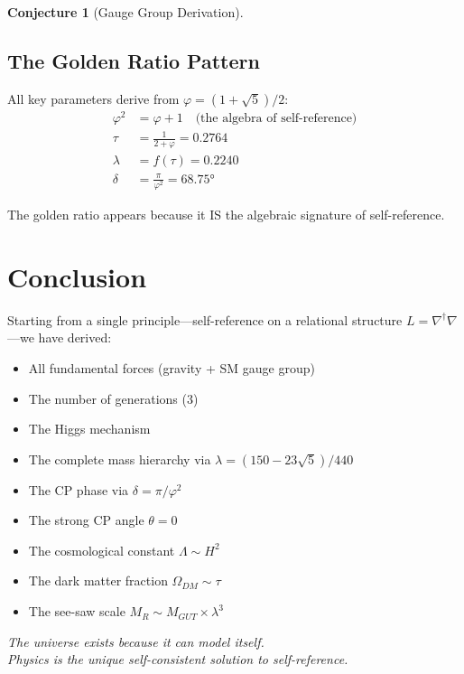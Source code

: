 \documentclass[11pt,a4paper]{article}
\theoremstyle{plain}
\theoremstyle{definition}
\newtheorem{conjecture}[theorem]{Conjecture}
\theoremstyle{remark}
\begin{document}
\begin{conjecture}[Gauge Group Derivation]
\subsection{The Golden Ratio Pattern}

All key parameters derive from $\varphi = (1+\sqrt{5})/2$:
\begin{align}
\varphi^2 &= \varphi + 1 \quad \text{(the algebra of self-reference)} \\
\tau &= \frac{1}{2+\varphi} = 0.2764 \\
\lambda &= f(\tau) = 0.2240 \\
\delta &= \frac{\pi}{\varphi^2} = 68.75°
\end{align}

The golden ratio appears because it IS the algebraic signature of self-reference.

\section{Conclusion}

Starting from a single principle---self-reference on a relational structure $L = \nabla^\dagger\nabla$---we have derived:

\begin{itemize}
    \item All fundamental forces (gravity + SM gauge group)
    \item The number of generations (3)
    \item The Higgs mechanism
    \item The complete mass hierarchy via $\lambda = (150-23\sqrt{5})/440$
    \item The CP phase via $\delta = \pi/\varphi^2$
    \item The strong CP angle $\theta = 0$
    \item The cosmological constant $\Lambda \sim H^2$
    \item The dark matter fraction $\Omega_{DM} \sim \tau$
    \item The see-saw scale $M_R \sim M_{GUT} \times \lambda^3$
\end{itemize}

\begin{center}
\large\itshape
The universe exists because it can model itself.\\
Physics is the unique self-consistent solution to self-reference.
\end{center}


\end{conjecture}
\end{document}
